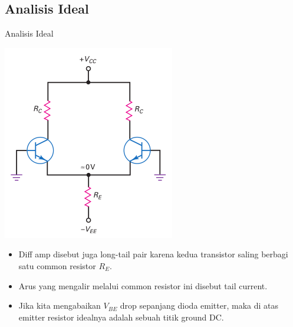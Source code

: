 \documentclass[aspectratio=169]{beamer}
\begin{document}
\subsection{Analisis Ideal}
\begin{frame}{Analisis Ideal}
	\begin{multicols}{2}
		\begin{center}
			\includegraphics[width=0.7\textheight]{gambar/01.ideal_dc_analysis}
		\end{center}
		\columnbreak
		\begin{itemize}
			\item Diff amp disebut juga long-tail pair karena kedua transistor saling berbagi satu common resistor $ R_E $.
			\item Arus yang mengalir melalui common resistor ini disebut tail current.
			\item Jika kita mengabaikan $ V_{BE} $ drop sepanjang dioda emitter, maka di atas emitter resistor idealnya adalah sebuah titik ground DC.
		\end{itemize}
		\vfill\null
	\end{multicols}
\end{frame}
\end{document}

